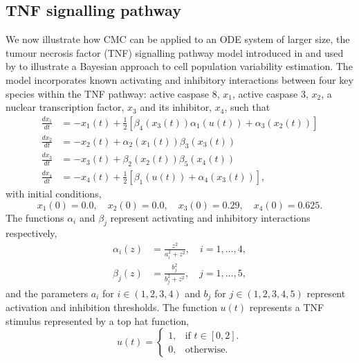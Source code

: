 \subsection{TNF signalling pathway}
We now illustrate how CMC can be applied to an ODE system of larger size, the tumour necrosis factor (TNF) signalling pathway model introduced in \cite{chaves2008bistable} and used by \cite{hasenauer2011identification} to illustrate a Bayesian approach to cell population variability estimation. The model incorporates known activating and inhibitory interactions between four key species within the TNF pathway: active caspase 8, $x_1$, active caspase 3, $x_2$, a nuclear transcription factor, $x_3$ and its inhibitor, $x_4$, such that
%
\begin{equation}\label{eq:tnf}
\begin{aligned}
\frac{dx_1}{dt} &= -x_1(t) + \frac{1}{2}\left[\beta_4(x_3(t))\alpha_1(u(t)) + \alpha_3(x_2(t))\right]\\
\frac{dx_2}{dt} &= -x_2(t) + \alpha_2(x_1(t)) \beta_3(x_3(t))\\
\frac{dx_3}{dt} &= -x_3(t) + \beta_2(x_2(t)) \beta_5(x_4(t))\\
\frac{dx_4}{dt} &= -x_4(t) + \frac{1}{2}\left[\beta_1(u(t)) + \alpha_4(x_3(t))\right],
\end{aligned}
\end{equation}
%
with initial conditions,
\begin{equation}
x_1(0)=0.0, \quad x_2(0)=0.0, \quad x_3(0)=0.29, \quad x_4(0)=0.625.
\end{equation}
The functions $\alpha_i$ and $\beta_j$ represent activating and inhibitory interactions respectively,
%
\begin{equation}
\begin{aligned}
\alpha_i(z) &= \frac{z^2}{a_i^2 + z^2}, \quad i=1, \dots, 4,\\
\beta_j(z)  &= \frac{b_j^2}{b_j^2 + z^2}, \quad j = 1, \dots, 5,
\end{aligned}
\end{equation}
%
and the parameters $a_i$ for $i\in(1,2,3,4)$ and $b_j$ for $j\in(1,2,3,4,5)$ represent activation and inhibition thresholds. The function $u(t)$ represents a TNF stimulus represented by a top hat function,
%
\begin{equation}
u(t)=\begin{cases}
1, & \text{if $t\in[0,2]$}.\\
0, & \text{otherwise}.
\end{cases}
\end{equation}
